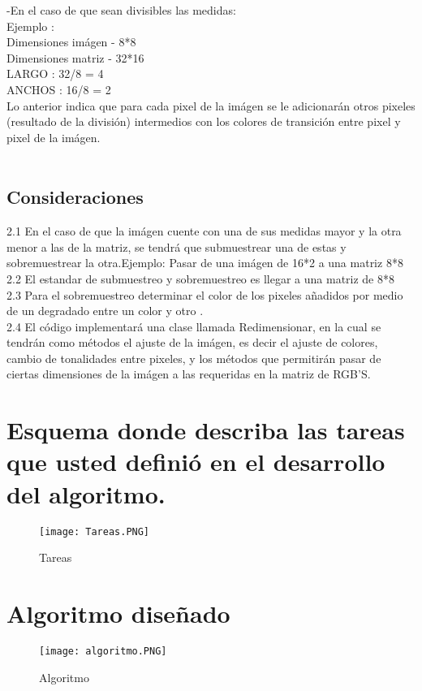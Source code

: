 \documentclass{article}
\begin{document}
   -En el caso de que sean divisibles las medidas:\\
   Ejemplo :\\
   Dimensiones imágen - 8*8\\
   Dimensiones matriz - 32*16\\
   
   LARGO : 32/8 = 4\\
   ANCHOS : 16/8 = 2\\
   
   Lo anterior indica que para cada pixel de la imágen se le adicionarán otros pixeles (resultado de la división) intermedios con los colores de transición entre pixel y pixel de la imágen. \\
   \\
   \subsection{Consideraciones}

  2.1 En el caso de que la imágen cuente con una de sus medidas mayor y la otra menor a las de la matriz, se tendrá que submuestrear una de estas y sobremuestrear la otra.Ejemplo: Pasar de una imágen de 16*2 a una matriz 8*8\\
  
  2.2 El estandar de submuestreo y sobremuestreo es llegar a una matriz de 8*8\\
  
  2.3 Para el sobremuestreo determinar el color de los pixeles añadidos por medio de un degradado entre un color y otro .\\
  2.4 El código implementará una clase llamada Redimensionar, en la cual se tendrán como métodos el ajuste de la imágen, es decir el ajuste de colores, cambio de tonalidades entre pixeles, y los métodos que permitirán pasar de ciertas dimensiones de la imágen a las requeridas en la matriz de RGB'S. 
  
   
\section{Esquema donde describa las tareas que usted definió en el desarrollo del
algoritmo.} \label{Descripción}


\begin{figure}[H]
    \centering
    \texttt{[image: Tareas.PNG]}
    \caption{Tareas}
    \label{juego}
\end{figure}

\section{Algoritmo diseñado}
\begin{figure}[H]
    \centering
    \texttt{[image: algoritmo.PNG]}
    \caption{Algoritmo}
    \label{juego}
\end{figure}
\end{document}
